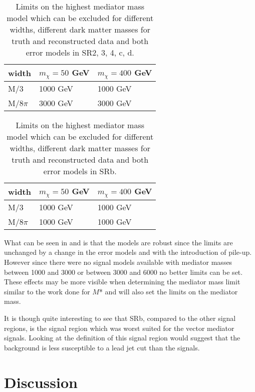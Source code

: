 \begin{table}[ht]
\begin{center}
\begin{tabular}{|l|l|l|}
\hline
width & $m_{\chi}=50$ GeV & $m_{\chi}=400$ GeV \\ \hline
M/3 & 1000 GeV & 1000 GeV \\ \hline
M/$8\pi$ & 3000 GeV & 3000 GeV\\ \hline
\end{tabular}
\caption{Limits on the highest mediator mass model which can be excluded for different widths, different dark matter masses for truth and reconstructed data and both error models in SR2, 3, 4, c, d.}
\label{tab:mediatorpass}
\end{center}
\end{table}
\begin{table}[ht]
\begin{center}
\begin{tabular}{|l|l|l|}
\hline
width & $m_{\chi}=50$ GeV & $m_{\chi}=400$ GeV \\ \hline
M/3 & 1000 GeV & 1000 GeV\\ \hline
M/$8\pi$ & 1000 GeV & 1000 GeV\\ \hline
\end{tabular}
\caption{Limits on the highest mediator mass model which can be excluded for different widths, different dark matter masses for truth and reconstructed data and both error models in SRb.}
\label{tab:mediatorpass2}
\end{center}
\end{table}

What can be seen in  and  is that the models are robust since the limits are unchanged by a change in the error models and with the introduction of pile-up. However since there were no signal models available with mediator masses between 1000 and 3000 or between 3000 and 6000 no better limits can be set. These effects may be more visible when determining the mediator mass limit similar to the work done for $M$* and will also set the limits on the mediator mass. 

It is though quite interesting to see that SRb, compared to the other signal regions, is the signal region which was worst suited for the vector mediator signals. Looking at the definition of this signal region would suggest that the background is less susceptible to a lead jet cut than the signals.

\newpage
\section{Discussion}
